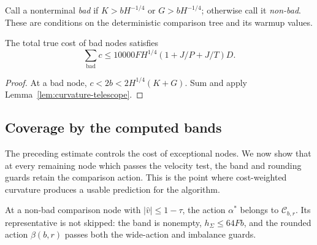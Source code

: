 Call a nonterminal \emph{bad} if $K>bH^{-1/4}$ or $G>bH^{-1/4}$; otherwise
call it \emph{non-bad}.  These are conditions on the deterministic comparison
tree and its warmup values.

\begin{corollary}\label{cor:bad-node-cost}
The total true cost of bad nodes satisfies
\begin{equation}\label{eq:bad-node-cost}
 \sum_{\mathrm{bad}}c
 \le10000FH^{1/4}(1+J/P+J/T)D.
\end{equation}
\end{corollary}

\begin{proof}
At a bad node, $c<2b<2H^{1/4}(K+G)$.  Sum and apply
Lemma~\ref{lem:curvature-telescope}.
\end{proof}

\subsection{Coverage by the computed bands}

The preceding estimate controls the cost of exceptional nodes.  We now show
that at every remaining node which passes the velocity test, the band and
rounding guards retain the comparison action.  This is the point where
cost-weighted curvature produces a usable prediction for the algorithm.

\begin{lemma}\label{lem:comparison-band}
At a non-bad comparison node with $|\widehat v|\le1-\tau$, the action
$\alpha^*$ belongs to $\mathcal C_{b,r}$.  Its representative is not skipped:
the band is nonempty, $h_\Sigma\le64Fb$, and the rounded action $\beta(b,r)$
passes both the wide-action and imbalance guards.
\end{lemma}

